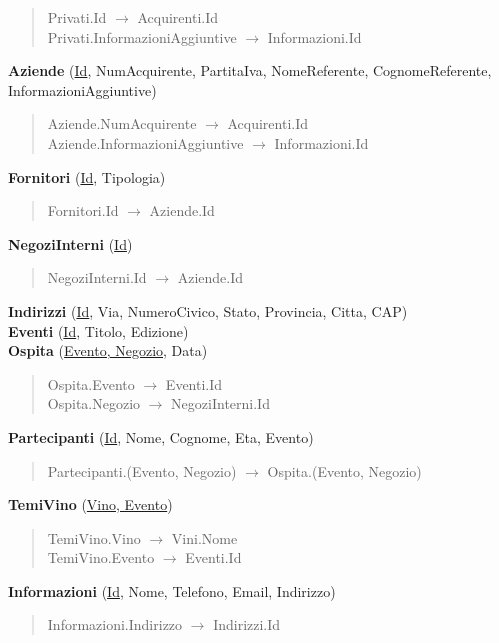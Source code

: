 \begin{verse}
	Privati.Id $\to$ Acquirenti.Id\\
	Privati.InformazioniAggiuntive $\to$ Informazioni.Id
\end{verse} 
\textbf{Aziende} (\underline{Id}, NumAcquirente, PartitaIva, NomeReferente, CognomeReferente, InformazioniAggiuntive)
\begin{verse}
	Aziende.NumAcquirente $\to$ Acquirenti.Id\\
	Aziende.InformazioniAggiuntive $\to$ Informazioni.Id
\end{verse}
\textbf{Fornitori} (\underline{Id}, Tipologia)
\begin{verse}
	Fornitori.Id $\to$ Aziende.Id
\end{verse} 
\textbf{NegoziInterni} (\underline{Id})
\begin{verse}
	NegoziInterni.Id $\to$ Aziende.Id
\end{verse} 
\textbf{Indirizzi} (\underline{Id}, Via, NumeroCivico, Stato, Provincia, Citta, CAP)\\
\textbf{Eventi} (\underline{Id}, Titolo, Edizione)\\
\textbf{Ospita} (\underline{Evento, Negozio}, Data)
\begin{verse}
	Ospita.Evento $\to$ Eventi.Id\\
	Ospita.Negozio $\to$ NegoziInterni.Id
\end{verse} 
\textbf{Partecipanti} (\underline{Id}, Nome, Cognome, Eta, Evento)
\begin{verse}
	Partecipanti.(Evento, Negozio) $\to$ Ospita.(Evento, Negozio)
\end{verse} 
\textbf{TemiVino} (\underline{Vino, Evento})
\begin{verse}
	TemiVino.Vino $\to$ Vini.Nome\\
	TemiVino.Evento $\to$ Eventi.Id
\end{verse}
\textbf{Informazioni} (\underline{Id}, Nome, Telefono, Email, Indirizzo)
\begin{verse}
	Informazioni.Indirizzo $\to$ Indirizzi.Id
\end{verse} 